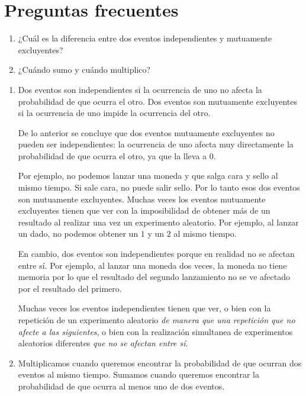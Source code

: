 \section{Preguntas frecuentes}

\begin{enumerate}
\item ¿Cuál es la diferencia entre dos eventos independientes y mutuamente excluyentes?
\item ¿Cuándo sumo y cuándo multiplico?
\end{enumerate}

\begin{marginfigure}
\caption{Eventos mutuamente excluyentes.}
\end{marginfigure}
\begin{enumerate}
\item Dos eventos son independientes si la ocurrencia de uno no afecta la probabilidad de que ocurra el otro. Dos eventos son mutuamente excluyentes si la ocurrencia de uno impide la ocurrencia del otro. 

De lo anterior se concluye que dos eventos mutuamente excluyentes no pueden ser independientes: la ocurrencia de uno afecta muy directamente la probabilidad de que ocurra el otro, ya que la lleva a 0. 

Por ejemplo, no podemos lanzar una moneda y que salga cara y sello al mismo tiempo. Si sale cara, no puede salir sello. Por lo tanto esos dos eventos son mutuamente excluyentes. Muchas veces los eventos mutuamente excluyentes tienen que ver con la imposibilidad de obtener más de un resultado al realizar una vez un experimento aleatorio. Por ejemplo, al lanzar un dado, no podemos obtener un \(1\) y un \(2\) al mismo tiempo.

En cambio, dos eventos son independientes porque en realidad no se afectan entre sí. Por ejemplo, al lanzar una moneda dos veces, la moneda no tiene memoria por lo que el resultado del segundo lanzamiento no se ve afectado por el resultado del primero.

Muchas veces los eventos independientes tienen que ver, o bien con la repetición de un experimento aleatorio \emph{de manera que una repetición que no afecte a las siguientes}, o bien con la realización simultanea de experimentos aleatorios diferentes \emph{que no se afectan entre sí}.

\item Multiplicamos cuando queremos encontrar la probabilidad de que ocurran dos eventos al mismo tiempo. Sumamos cuando queremos encontrar la probabilidad de que ocurra al menos uno de dos eventos. 
\end{enumerate}

